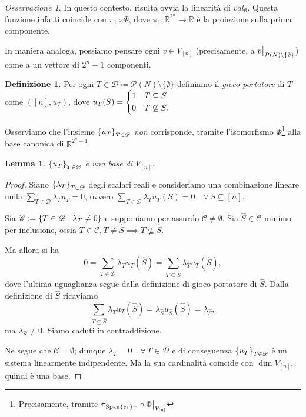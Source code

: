 \documentclass[a4paper,11pt]{article}
\theoremstyle{definition}				%
\newtheorem{definizione}{Definizione}%
\theoremstyle{remark}
\newtheorem{oss}{Osservazione}%
\theoremstyle{plain}
\newtheorem{lemma}{Lemma}%
\newcommand\restr[2]{{											%
		\left.\kern-\nulldelimiterspace %
		#1 %
		\vphantom{\big|} %
		\right|_{#2} %
}}
\newcommand{\R}{\mathbb{R}}										%
\begin{document}
	\begin{oss}
		In questo contesto, risulta ovvia la linearità di $\textit{val}_{\emptyset}$. Questa funzione infatti coincide con $\pi_1\circ\Phi$, dove $\pi_1\colon\R^{2^n}\to\R$ è la proiezione sulla prima componente.
	\end{oss}
	
	In maniera analoga, possiamo pensare ogni $v\in V_{[n]}$ (precisamente, a $\restr{v}{\mathcal{P}(N)\setminus\qty{\emptyset}}$) come a un vettore di $2^n-1$ componenti.
    \begin{definizione}\label{def:carrier_game}
        Per ogni $T\in\mathscr{D}\coloneqq\mathcal{P}(N)\setminus\{\emptyset\}$ definiamo il \emph{gioco portatore} di $T$ come $\left([n],u_T\right)$, dove $u_T(S)=\begin{dcases}1 & T\subseteq S\\ 0 & T\not\subseteq S.\end{dcases}$
    \end{definizione}
    Osserviamo che l'insieme $\qty{u_T}_{T\in\mathscr{D}}$ \emph{non} corrisponde, tramite l'isomorfismo $\Phi$\footnote{Precisamente, tramite $\pi_{\mathrm{Span}\{e_1\}^{\perp}}\circ\restr{\Phi}{V_{[n]}}$} alla base canonica di $\R^{2^n-1}$.
    \begin{lemma}\label{lemma:basis}
        $\qty{u_T}_{T\in\mathscr{D}}$ è una base di $V_{[n]}$.
    \end{lemma}
    \begin{proof}
        Siano $\qty{\lambda_{T}}_{T\in\mathscr{D}}$ degli scalari reali e consideriamo una combinazione lineare nulla $\sum_{T\in\mathscr{D}}\lambda_Tu_T=0$, ovvero $\sum_{T\in\mathscr{D}}\lambda_Tu_T(S)=0\quad\forall\,S\subseteq[n]$.

        Sia $\mathscr{C}\coloneqq\qty{T\in\mathscr{D}\mid\lambda_T\neq 0}$ e supponiamo per assurdo $\mathscr{C}\ne\emptyset$. Sia $\hat{S}\in\mathscr{C}$ minimo per inclusione, ossia $T\in\mathscr{C}, T\ne\hat{S}\implies T\not\subseteq\hat{S}$.

        Ma allora si ha
        \[
            0=\sum_{T\in\mathscr{D}}\lambda_Tu_T(\hat{S})=\sum_{T\subseteq\hat{S}}\lambda_Tu_T(\hat{S}),
        \]
        dove l'ultima uguaglianza segue dalla definizione di gioco portatore di $\hat{S}$. Dalla definizione di $\hat{S}$ ricaviamo 
        \[
            \sum_{T\subseteq\hat{S}}\lambda_Tu_T(\hat{S})=\lambda_{\hat{S}}u_{\hat{S}}(\hat{S})=\lambda_{\hat{S}},
        \]
        ma $\lambda_{\hat{S}}\ne 0$. Siamo caduti in contraddizione.

        Ne segue che $\mathscr{C}=\emptyset$; dunque $\lambda_T=0\quad\forall\,T\in\mathscr{D}$ e di conseguenza $\qty{u_T}_{T\in\mathscr{D}}$ è un sistema linearmente indipendente. Ma la sua cardinalità coincide con $\dim V_{[n]}$, quindi è una base.
    \end{proof}
	
\end{document}
